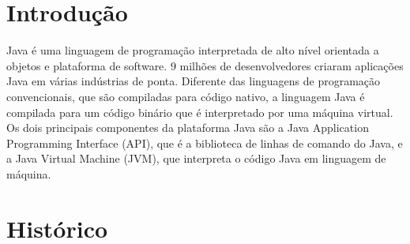 \documentclass[
	12pt,				%
	openright,			%
	oneside,			%
	a4paper,			%
	english,			%
	french,				%
	spanish,			%
	brazil				%
	]{abntex2}
\begin{document}
\frenchspacing 


\imprimircapa


\imprimirfolhaderosto*



\listoffigures*
\cleardoublepage


\tableofcontents*




\textual

\chapter[Introdução]{Introdução}

Java é uma linguagem de programação interpretada de alto nível orientada a objetos
e plataforma de software. 9 milhões de desenvolvedores criaram aplicações Java em várias
indústrias de ponta.
Diferente das linguagens de programação convencionais, que são compiladas para
código nativo, a linguagem Java é compilada para um código binário que é interpretado por
uma máquina virtual.
Os dois principais componentes da plataforma Java são a Java Application
Programming Interface (API), que é a biblioteca de linhas de comando do Java, e a Java
Virtual Machine (JVM), que interpreta o código Java em linguagem de máquina.

{\let\clearpage\relax \chapter[Histórico]{Histórico}}
\end{document}

